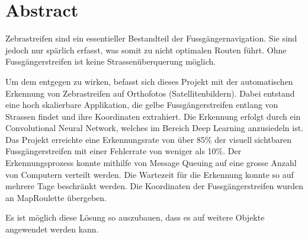 \chapter*{Abstract}

Zebrastreifen sind ein essentieller Bestandteil der Fussgängernavigation. Sie sind jedoch  nur spärlich erfasst, was somit zu nicht optimalen Routen führt. Ohne Fussgängerstreifen ist keine Strassenüberquerung möglich.

Um dem entgegen zu wirken,  befasst sich dieses Projekt mit der automatischen Erkennung von Zebrastreifen auf Orthofotos (Satellitenbildern). 
Dabei entstand eine hoch skalierbare Applikation, die gelbe Fussgängerstreifen entlang von Strassen findet und ihre Koordinaten extrahiert. Die Erkennung erfolgt durch ein Convolutional Neural Network, welches im Bereich Deep Learning anzusiedeln ist.
Das Projekt erreichte eine Erkennungsrate von über 85\% der visuell sichtbaren Fussgängerstreifen mit einer Fehlerrate von weniger als 10\%. Der Erkennungsprozess konnte mithilfe von Message Queuing auf eine grosse Anzahl von Computern verteilt werden. Die Wartezeit für die Erkennung konnte so auf mehrere Tage beschränkt werden. Die Koordinaten der Fussgängerstreifen wurden an MapRoulette übergeben.

Es ist möglich diese Lösung so auszubauen, dass es auf weitere Objekte angewendet werden kann.
